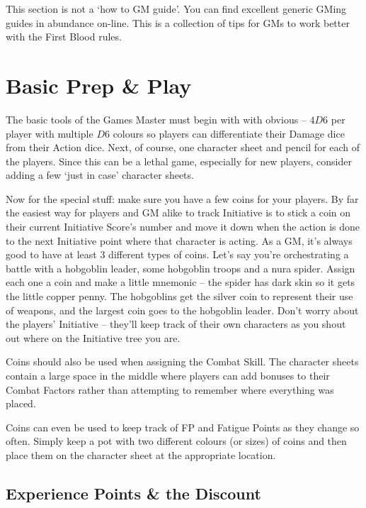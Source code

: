 
This section is not a `how to GM guide'.  You can find excellent generic GMing guides in abundance on-line.  This is a collection of tips for GMs to work better with the First Blood rules.

\section{Basic Prep \& Play}

The basic tools of the Games Master must begin with with obvious -- $4D6$ per player with multiple $D6$ colours so players can differentiate their Damage dice from their Action dice.  Next, of course, one character sheet and pencil for each of the players.  Since this can be a lethal game, especially for new players, consider adding a few `just in case' character sheets.

Now for the special stuff: make sure you have a few coins for your players.  By far the easiest way for players and GM alike to track Initiative is to stick a coin on their current Initiative Score's number and move it down when the action is done to the next Initiative point where that character is acting.  As a GM, it's always good to have at least 3 different types of coins.  Let's say you're orchestrating a battle with a hobgoblin leader, some hobgoblin troops and a nura spider. Assign each one a coin and make a little mnemonic -- the spider has dark skin so it gets the little copper penny.  The hobgoblins get the silver coin to represent their use of weapons, and the largest coin goes to the hobgoblin leader.  Don't worry about the players' Initiative -- they'll keep track of their own characters as you shout out where on the Initiative tree you are.

Coins should also be used when assigning the Combat Skill.  The character sheets contain a large space in the middle where players can add bonuses to their Combat Factors rather than attempting to remember where everything was placed.

Coins can even be used to keep track of FP and Fatigue Points as they change so often.  Simply keep a pot with two different colours (or sizes) of coins and then place them on the character sheet at the appropriate location.

\subsection{Experience Points \& the Discount}

